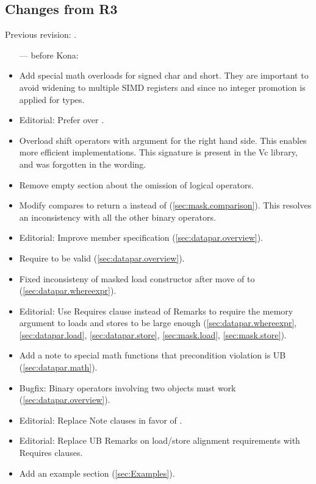 \subsection{Changes from R3}
Previous revision: \parencite{P0214R3}.
\begin{itemize}
  \color{black}\item[---] before Kona:
  \item Add special math overloads for signed char and short.
        They are important to avoid widening to multiple SIMD registers and since no integer promotion is applied for \datapar types.
  \item Editorial: Prefer  over .
  \item Overload shift operators with \intt argument for the right hand side.
        This enables more efficient implementations.
        This signature is present in the Vc library, and was forgotten in the wording.
  \item Remove empty section about the omission of logical operators.
  \item Modify \mask compares to return a \mask instead of \bool (\ref{sec:mask.comparison}).
        This resolves an inconsistency with all the other binary operators.
  \item Editorial: Improve  member specification (\ref{sec:datapar.overview}).
  \item Require  to be valid (\ref{sec:datapar.overview}).
  \item Fixed inconsisteny of masked load constructor after move of  to  (\ref{sec:datapar.whereexpr}).
  \item Editorial: Use Requires clause instead of Remarks to require the memory argument to loads and stores to be large enough (\ref{sec:datapar.whereexpr}, \ref{sec:datapar.load}, \ref{sec:datapar.store}, \ref{sec:mask.load}, \ref{sec:mask.store}).
  \item Add a note to special math functions that precondition violation is UB (\ref{sec:datapar.math}).
  \item Bugfix: Binary operators involving two  objects must work (\ref{sec:datapar.overview}).
  \item Editorial: Replace Note clauses in favor of \wgNote{}.
  \item Editorial: Replace UB Remarks on load/store alignment requirements with Requires clauses.
  \item Add an example section (\ref{sec:Examples}).


\end{itemize}
